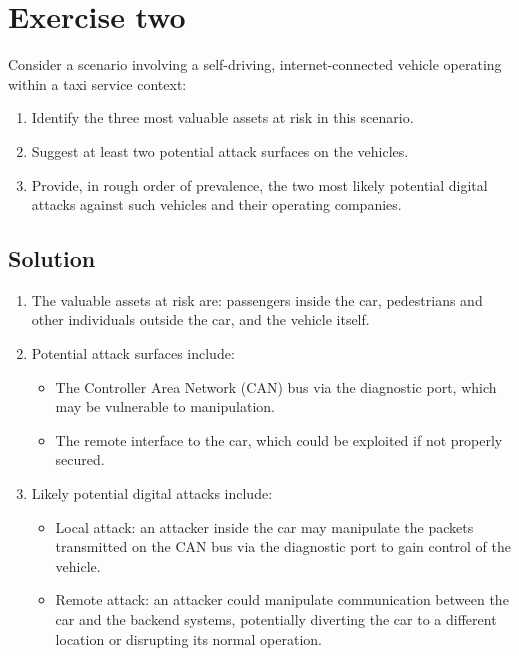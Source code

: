 \section{Exercise two}

Consider a scenario involving a self-driving, internet-connected vehicle operating within a taxi service context:
\begin{enumerate}
    \item Identify the three most valuable assets at risk in this scenario.
    \item Suggest at least two potential attack surfaces on the vehicles.
    \item Provide, in rough order of prevalence, the two most likely potential digital attacks against such vehicles and their operating companies.
\end{enumerate}

\subsection{Solution}
\begin{enumerate}
    \item The valuable assets at risk are: passengers inside the car, pedestrians and other individuals outside the car, and the vehicle itself.
    \item Potential attack surfaces include:
        \begin{itemize}
            \item The Controller Area Network (CAN) bus via the diagnostic port, which may be vulnerable to manipulation.
            \item The remote interface to the car, which could be exploited if not properly secured.
        \end{itemize}
    \item Likely potential digital attacks include:
    \begin{itemize}
        \item Local attack: an attacker inside the car may manipulate the packets transmitted on the CAN bus via the diagnostic port to gain control of the vehicle.
        \item Remote attack: an attacker could manipulate communication between the car and the backend systems, potentially diverting the car to a different location or disrupting its normal operation.
        \end{itemize}
\end{enumerate}